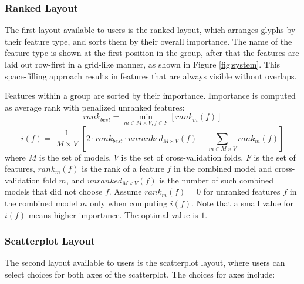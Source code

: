 


\subsubsection{Ranked Layout}\label{sec:rankedlayout}
The first layout available to users is the ranked layout, which arranges glyphs by their feature type, and sorts them by their overall importance.  The name of the feature type is shown at the first position in the group, after that the features are laid out row-first in a grid-like manner, as shown in Figure \ref{fig:system}. This space-filling approach results in features that are always visible without overlaps.

Features within a group are sorted by their importance. Importance is computed as average rank with
penalized unranked features:
\[
rank_{best} = \min_{m \in M \times V, f \in F}{[rank_{m}(f)]}
\]\[
i(f) = \dfrac{1}{| M \times V |}[
2 \cdot rank_{best} \cdot
unranked_{M \times V} (f)
+ \sum_{m \in M \times V} rank_{m}(f)
]
\]
where $M$ is the set of models, $V$ is the set of cross-validation folds,
$F$ is the set of features,
$rank_{m}(f)$ is the rank of a feature $f$ in the combined model
and cross-validation fold $m$,
and $unranked_{M \times V} (f)$ is the number
of such combined models that did not choose $f$.
Assume $rank_{m}(f) = 0$ for unranked features $f$
in the combined model $m$ only when computing $i(f)$.
Note that a small value for $i(f)$ means higher importance.
The optimal value is $1$.

\subsubsection{Scatterplot Layout}\label{sec:scatterplotlayout}
The second layout available to users is the scatterplot layout, where users can select choices for both axes of the scatterplot.  The choices for axes include:

